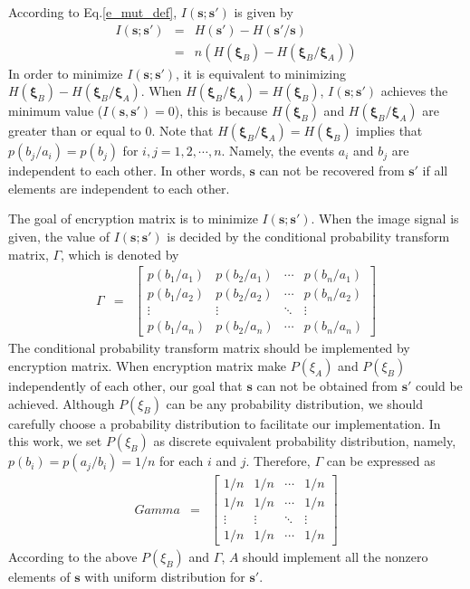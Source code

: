 \documentclass[conference]{IEEEtran}
\begin{document}
According to Eq.\ref{e_mut_def}, $I(\mathbf{s};\mathbf{s}')$ is given by
\begin{eqnarray*}
    I(\mathbf{s};\mathbf{s}') & = & H(\mathbf{s}')-H(\mathbf{s}'/\mathbf{s}) \\
     & = & n(H(\mathbf{\xi}_B)-H(\mathbf{\xi}_B/\mathbf{\xi}_A))
\end{eqnarray*}
In order to minimize $I(\mathbf{s};\mathbf{s}')$, it is equivalent to minimizing $H(\mathbf{\xi}_B)-H(\mathbf{\xi}_B/\mathbf{\xi}_A)$. When $H(\mathbf{\xi}_B/\mathbf{\xi}_A)=H(\mathbf{\xi}_B)$, $I(\mathbf{s};\mathbf{s}')$ achieves the minimum value ($I(\mathbf{s},\mathbf{s}')=0$), this is because $H(\mathbf{\xi}_B)$ and $H(\mathbf{\xi}_B/\mathbf{\xi}_A)$ are greater than or equal to $0$. Note that $H(\mathbf{\xi}_B/\mathbf{\xi}_A)=H(\mathbf{\xi}_B)$ implies that  $p(b_j/a_i)=p(b_j)$ for $i,j=1,2,\cdots,n$.  Namely, the events $a_i$ and $b_j$ are independent to each other. In other words, $\mathbf{s}$ can not be recovered from $\mathbf{s}'$ if all elements  are independent to each other.

The goal of encryption matrix is to minimize $I(\mathbf{s};\mathbf{s}')$. When the image signal is given, the value of $I(\mathbf{s};\mathbf{s}')$ is decided by the conditional probability transform matrix, $\Gamma$, which is denoted by
\begin{eqnarray*}
\Gamma & = & \left[\begin{array}{cccc}
p(b_{1}/a_{1}) & p(b_{2}/a_{1}) & \cdots & p(b_{n}/a_{1})\\
p(b_{1}/a_{2}) & p(b_{2}/a_{2}) & \cdots & p(b_{n}/a_{2})\\
\vdots & \vdots & \ddots & \vdots\\
p(b_{1}/a_{n}) & p(b_{2}/a_{n}) & \cdots & p(b_{n}/a_{n})
\end{array}\right]
\end{eqnarray*}
The conditional probability transform matrix should be implemented by encryption matrix. When encryption matrix make
$P(\xi_A)$ and $P(\xi_B)$ independently of each other, our goal that $\mathbf{s}$ can not be obtained from $\mathbf{s}'$ could be achieved.
Although $P(\xi_B)$ can be any probability distribution, we should carefully choose a probability distribution to facilitate our implementation.
In this work, we set $P(\xi_B)$ as discrete equivalent probability distribution, namely, $p(b_i)=p(a_j/b_i)=1/n$ for each $i$ and $j$. Therefore, $\Gamma$ can be expressed as
\begin{eqnarray*}
Gamma  &=& \left[\begin{array}{cccc}
1/n & 1/n & \cdots & 1/n\\
1/n & 1/n & \cdots & 1/n\\
\vdots & \vdots & \ddots & \vdots\\
1/n & 1/n & \cdots & 1/n
\end{array}\right]
\end{eqnarray*}
According to the above $P(\xi_B)$ and $\Gamma$, $A$ should implement all the nonzero elements of $\mathbf{s}$ with uniform distribution for $\mathbf{s}'$.
\end{document}
